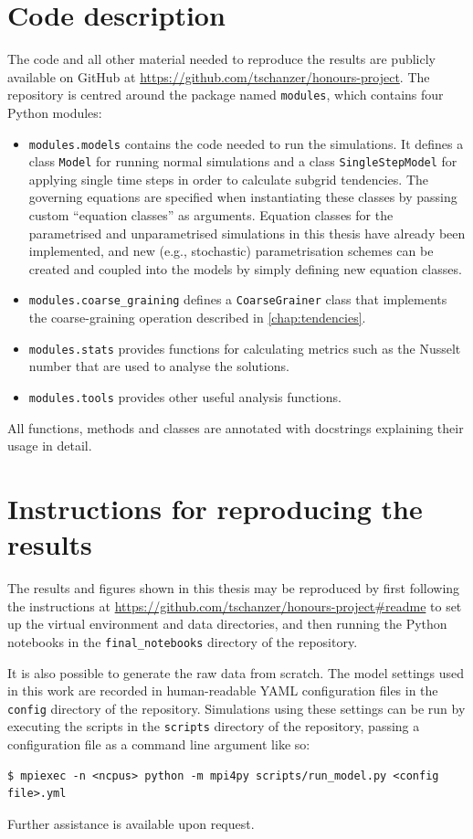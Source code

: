 \documentclass[../main.tex]{subfiles}
\begin{document}
\section{Code description}
The code and all other material needed to reproduce the results are
publicly available on GitHub at
\url{https://github.com/tschanzer/honours-project}. The repository is
centred around the package named \texttt{modules}, which contains four
Python modules:
\begin{itemize}
    \item \texttt{modules.models} contains the code needed to run the
        simulations. It defines a class \texttt{Model} for running normal
        simulations and a class \texttt{SingleStepModel} for applying single
        time steps in order to calculate subgrid tendencies. The governing
        equations are specified when instantiating these classes by passing
        custom ``equation classes'' as arguments. Equation classes for the
        parametrised and unparametrised simulations in this thesis have already
        been implemented, and new (e.g., stochastic) parametrisation schemes
        can be created and coupled into the models by simply defining new
        equation classes.
    \item \texttt{modules.coarse\_graining} defines a \texttt{CoarseGrainer}
        class that implements the coarse-graining operation described in
        \cref{chap:tendencies}.
    \item \texttt{modules.stats} provides functions for calculating metrics
        such as the Nusselt number that are used to analyse the solutions.
    \item \texttt{modules.tools} provides other useful analysis functions.
\end{itemize}
All functions, methods and classes are annotated with docstrings explaining
their usage in detail.

\section{Instructions for reproducing the results}
The results and figures shown in this thesis may be reproduced by first
following the instructions at
\url{https://github.com/tschanzer/honours-project#readme} to set up the
virtual environment and data directories, and then running the Python
notebooks in the \texttt{final\_notebooks} directory of the repository.

It is also possible to generate the raw data from scratch. The model settings
used in this work are recorded in human-readable YAML configuration files in
the \texttt{config} directory of the repository. Simulations using these
settings can be run by executing the scripts in the \texttt{scripts} directory
of the repository, passing a configuration file as a command line argument
like so:
\begin{verbatim}
$ mpiexec -n <ncpus> python -m mpi4py scripts/run_model.py <config file>.yml
\end{verbatim}
Further assistance is available upon request.
\end{document}
